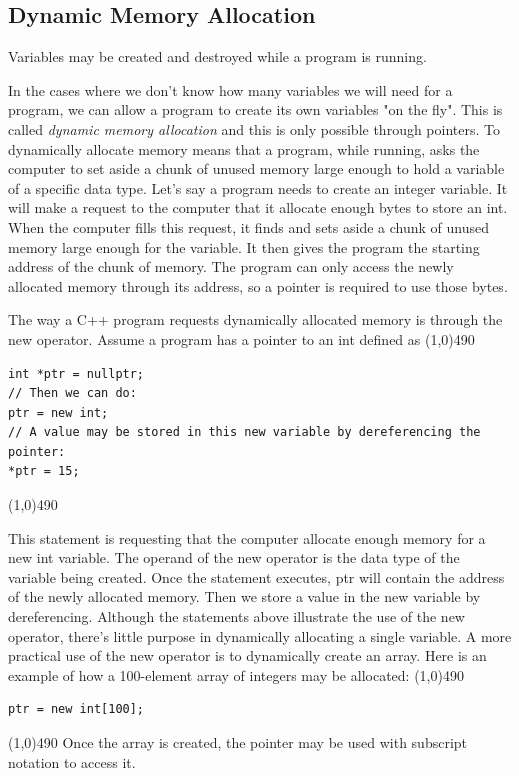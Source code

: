 \documentclass{report}
\begin{document}
    \bigbreak \noindent 
    \subsection{Dynamic Memory Allocation}
    \bigbreak \noindent 
    \begin{concept}
 Variables may be created and destroyed while a program is running.
	\end{concept}
    \bigbreak \noindent 
    In the cases where we don't know how many variables we will need for a program, we can allow a program to create its own variables "on the fly". This is called \textit{dynamic memory allocation} and this is only possible through pointers.
    \bigbreak \noindent 
    To dynamically allocate memory means that a program, while running, asks the computer
to set aside a chunk of unused memory large enough to hold a variable of a specific data
type. Let’s say a program needs to create an integer variable. It will make a request to the
computer that it allocate enough bytes to store an int. When the computer fills this request,
it finds and sets aside a chunk of unused memory large enough for the variable. It then gives
the program the starting address of the chunk of memory. The program can only access the
newly allocated memory through its address, so a pointer is required to use those bytes.

    \bigbreak \noindent 
    The way a C++ program requests dynamically allocated memory is through the new operator. Assume a program has a pointer to an int defined as
    \bigbreak \noindent 
    \line(1,0){490}
    \begin{verbatim}
int *ptr = nullptr;
// Then we can do:
ptr = new int;
// A value may be stored in this new variable by dereferencing the pointer:
*ptr = 15;
    \end{verbatim}
    \line(1,0){490}

    \bigbreak \noindent 
    This statement is requesting that the computer allocate enough memory for a new int variable. The operand of the new operator is the data type of the variable being created. Once the statement executes, ptr will contain the address of the newly allocated memory. Then we store a value in the new variable by dereferencing.
    \bigbreak \noindent 
    Although the statements above illustrate the use of the new operator, there’s little purpose
in dynamically allocating a single variable. A more practical use of the new operator is to
dynamically create an array. Here is an example of how a 100-element array of integers
may be allocated:
\bigbreak \noindent 
\line(1,0){490}
\begin{verbatim}
ptr = new int[100];
\end{verbatim}
\line(1,0){490}
\bigbreak \noindent 
    Once the array is created, the pointer may be used with subscript notation to access it. 
\end{document}
